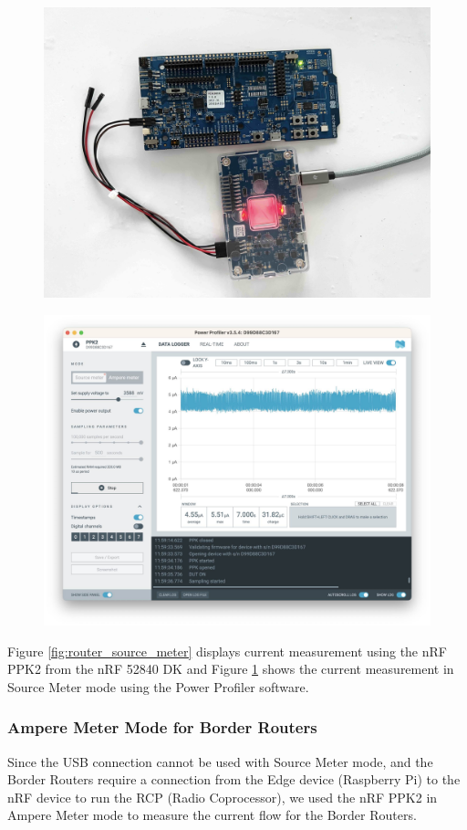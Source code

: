 \begin{figure}[h]
    \centering
    \begin{minipage}[t]{0.45\textwidth}
        \centering
        \includegraphics[width=0.7\linewidth]{images/research_design/PPK2_Router.jpg}
        \label{fig:router_source_meter}
    \end{minipage}\hfill
    \begin{minipage}[t]{0.45\textwidth}
        \centering
        \includegraphics[width=0.7\linewidth]{images/research_design/PPK2_SDK.jpg}
        \label{fig:ppk2_source_meter}
    \end{minipage}
\end{figure}

Figure \ref{fig:router_source_meter} displays current measurement using the nRF PPK2 from the nRF 52840 DK and Figure \ref{fig:ppk2_source_meter} shows the current measurement in Source Meter mode using the Power Profiler software.

\subsubsection{Ampere Meter Mode for Border Routers}\label{sec:ampere_meter_mode}
Since the USB connection cannot be used with Source Meter mode, and the Border Routers require a connection from the Edge device (Raspberry Pi) to the nRF device to run the RCP (Radio Coprocessor), we used the nRF PPK2 in Ampere Meter mode to measure the current flow for the Border Routers.

